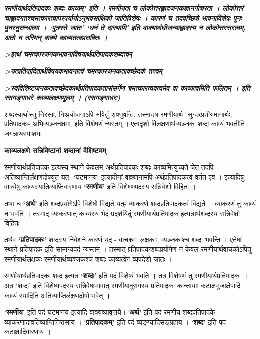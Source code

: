 \documentclass[10pt, a5paper, twoside]{article}
\begin{document}
\textit{\textbf{रमणीयार्थप्रतिपादकः शब्दः काव्यम्’ इति । रमणीयता च लोकोत्तरह्लादजनकज्ञानगोचरता । लोकोत्तरं चाह्लादगतश्चमत्कारत्वापरपर्यायोऽनुभवसाक्षिको जातिविशेषः । कारणं च तदवच्छिन्ने भावनाविशेषः पुनः पुनरनुसन्धात्मा । `पुत्रस्ते जातः' `धनं ते दास्यामि' इति वाक्यार्थधीजन्याह्लादस्य न लोकोत्तरत्तरत्वम्, अतो न तस्मिन् वाक्ये काव्यतत्वप्रसक्तिः ।}}

\textit{\textbf{>इत्थं चमत्कारजनकभावनाविषयार्थप्रतिपादकशब्दत्वम्}}

\textit{\textbf{>यत्प्रतिपादितार्थविषयकभावनात्वं चमत्कारजनकतावच्छेदकं तत्त्वम्}}

\textit{\textbf{>स्वविशिष्टजनकतावच्छेदकार्थप्रतिपादकतासंसर्गेण चमत्कारत्ववत्वमेव वा काव्यत्वमिति फलितम् । इति रसगङ्गाधरे काव्यलक्षणमूलम् । (रसगङ्गाधरः)}}

शब्दस्यार्थास्तु निरसाः, निष्प्रयोजनाऽपि भवितुं शक्नुवन्ति, तस्मादत्र रमणीयार्थ- सुन्दरप्रतीयमानार्थः, प्रतिपादकः- अभिव्यञ्जनक्षमः, इति विशेषणं न्यस्तम् । एतादृशो विलक्षणार्थव्यञ्जकः शब्दः काव्यं भवतीति जगन्नाथस्याशयः ।

\textbf{काव्यलक्षणे सन्निविष्टानां शब्दानां वैशिष्ट्यम्}

रमणीयार्थप्रतिपादक इत्यस्य स्थाने केवलम् अर्थप्रतिपादकः शब्दः काव्यमित्युच्यते चेत् तदपि अतिव्याप्तिर्लक्षणदोषयुतं  यत्- `घटमानय' इत्यादीनां वाक्यानामपि अर्थप्रतिपादकत्वं वर्तत एव । इत्यादिषु वाक्येषु काव्यस्यातिव्याप्तिवारणाय \textbf{`रमणीय'} इति विशेषणपदस्य सन्निवेशो विहितः ।

तथा च \textbf{`अर्थ'} इति शब्दप्रयोगेऽपि विशेषो विद्यते यत्- व्याकरणे शब्दप्रतिपादकत्वं विद्यते । व्याकरणं तु काव्यं न भवति । तस्माद्  व्याकरणात् काव्यस्य भेदं प्रदर्शयितुं रमणीयार्थप्रतिपादक इत्यत्रार्थशब्दस्य सन्निवेशो विहितः ।

तथैव \textbf{`प्रतिपादकः'} शब्दस्य निवेशने कारणं यद् - वाचकाः, लक्षकाः, व्यञ्जकाश्च शब्दा भवन्ति । एतेषां स्थाने प्रतिपादक इति सामान्यपदं न्यस्तम् । तस्मात् प्रतिपादकशब्दप्रयोगेण न केवलं रमणीयार्थवाचकोऽपितु रमणीयार्थलक्षकः रमणीयार्थव्यञ्जकश्च शब्दः काव्यत्वेन व्यपदेशो जातः ।

रमणीयार्थप्रतिपादकः शब्द इत्यत्र \textbf{`शब्दः'} इति पदं विशेष्यं भवति । तत्र विशेषणं तु रमणीयार्थप्रतिपादकः । अत्र `शब्दः' इति विशेष्यपदस्य सन्निवेषाभावात् रमणीयानुरागस्य प्रतिपादकः कान्तायाः कटाक्षभुजाक्षेपादिः काव्यं स्यादिति अतिव्याप्तिर्लक्षणदोषो भवेत् ।

‘\textbf{रमणीय’} इति पदं घटमानय इत्यादि वाक्यव्यावृत्तये। ‘\textbf{अर्थ’} इति पदं रमणीय शब्दप्रतिपादके व्याकरणादावतिव्याप्तिनिरासाय । ‘\textbf{प्रतिपादकम्’} इति  पदं व्यङ्ग्यादिसङ्ग्रहाय । ‘\textbf{शब्द’} इति पदं कटाक्षादिवारणाय   ।
\end{document}
